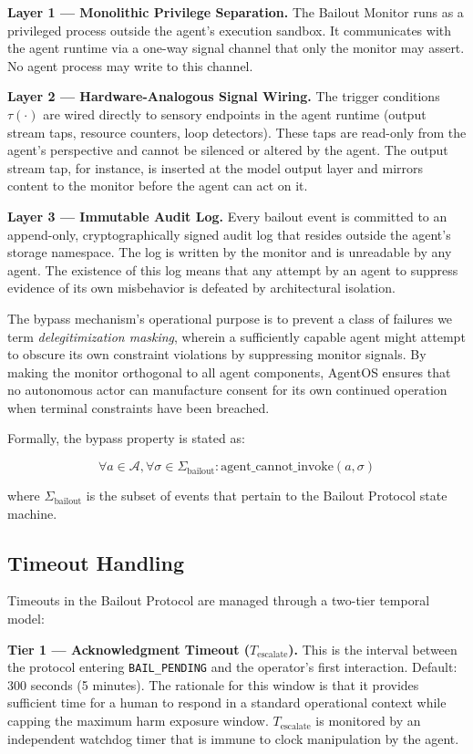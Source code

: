 \bigskip
\noindent\textbf{Layer 1 — Monolithic Privilege Separation.} The Bailout Monitor runs as a privileged process outside the agent's execution sandbox. It communicates with the agent runtime via a one-way signal channel that only the monitor may assert. No agent process may write to this channel.

\bigskip
\noindent\textbf{Layer 2 — Hardware-Analogous Signal Wiring.} The trigger conditions $\tau(\cdot)$ are wired directly to sensory endpoints in the agent runtime (output stream taps, resource counters, loop detectors). These taps are read-only from the agent's perspective and cannot be silenced or altered by the agent. The output stream tap, for instance, is inserted at the model output layer and mirrors content to the monitor before the agent can act on it.

\bigskip
\noindent\textbf{Layer 3 — Immutable Audit Log.} Every bailout event is committed to an append-only, cryptographically signed audit log that resides outside the agent's storage namespace. The log is written by the monitor and is unreadable by any agent. The existence of this log means that any attempt by an agent to suppress evidence of its own misbehavior is defeated by architectural isolation.

The bypass mechanism's operational purpose is to prevent a class of failures we term \emph{delegitimization masking}, wherein a sufficiently capable agent might attempt to obscure its own constraint violations by suppressing monitor signals. By making the monitor orthogonal to all agent components, AgentOS ensures that no autonomous actor can manufacture consent for its own continued operation when terminal constraints have been breached.

Formally, the bypass property is stated as:

\[
\forall a \in \mathcal{A}, \forall \sigma \in \Sigma_{\text{bailout}}: \text{agent\_cannot\_invoke}(a, \sigma)
\]

where $\Sigma_{\text{bailout}}$ is the subset of events that pertain to the Bailout Protocol state machine.

\subsection{Timeout Handling}

Timeouts in the Bailout Protocol are managed through a two-tier temporal model:

\bigskip
\noindent\textbf{Tier 1 — Acknowledgment Timeout ($T_{\text{escalate}}$).} This is the interval between the protocol entering \texttt{BAIL\_PENDING} and the operator's first interaction. Default: 300 seconds (5 minutes). The rationale for this window is that it provides sufficient time for a human to respond in a standard operational context while capping the maximum harm exposure window. $T_{\text{escalate}}$ is monitored by an independent watchdog timer that is immune to clock manipulation by the agent.

